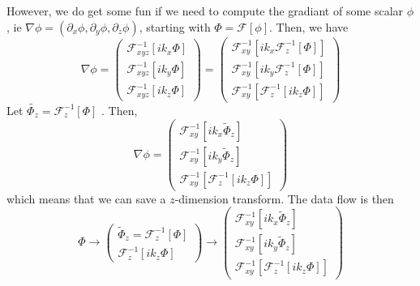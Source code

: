 \documentclass[12pt]{article}
\renewcommand{\(}{\left(}
\renewcommand{\)}{\right)}
\begin{document}
However, we do get some fun if we need to compute the gradiant of some
scalar $\phi$, ie
$\nabla\phi=\(\partial_x\phi,\partial_y\phi,\partial_z\phi\)$,
starting with $\Phi=\mathcal{F}\left[\phi\right]$.  Then, we have
\begin{dmath}
  \nabla\phi
  =
  \(
  \begin{matrix}
    \mathcal{F}^{-1}_{xyz}\left[ ik_x \Phi\right]\\
    \mathcal{F}^{-1}_{xyz}\left[ ik_y \Phi\right]\\
    \mathcal{F}^{-1}_{xyz}\left[ ik_z \Phi\right]
  \end{matrix}
  \)
  =
  \(
  \begin{matrix}
    \mathcal{F}^{-1}_{xy}\left[ik_x\mathcal{F}^{-1}_{z}\left[  \Phi\right]\right]\\
    \mathcal{F}^{-1}_{xy}\left[ik_y\mathcal{F}^{-1}_{z}\left[  \Phi\right]\right]\\
    \mathcal{F}^{-1}_{xy}\left[\mathcal{F}^{-1}_{z}\left[ ik_z \Phi\right]\right]
  \end{matrix}
  \)
\end{dmath}
Let $\tilde{\Phi_z}=\mathcal{F}^{-1}_{z}\left[\Phi\right]$ .  Then,
\begin{dmath}
  \nabla\phi
  =
  \(
  \begin{matrix}
    \mathcal{F}^{-1}_{xy}\left[ik_x \tilde\Phi_z \right]\\
    \mathcal{F}^{-1}_{xy}\left[ik_y \tilde\Phi_z \right]\\
    \mathcal{F}^{-1}_{xy}\left[\mathcal{F}^{-1}_{z}\left[ ik_z \Phi\right]\right]
  \end{matrix}
  \)
\end{dmath}
which means that we can save a $z$-dimension transform.  The data flow
is then
\begin{dmath}
  \Phi
  \rightarrow
  \left(
  \begin{matrix}
    \tilde\Phi_z=\mathcal{F}^{-1}_{z}\left[\Phi\right]\\
    \mathcal{F}^{-1}_{z}\left[ ik_z \Phi\right]
  \end{matrix}
  \right)
  \rightarrow
  \(
  \begin{matrix}
    \mathcal{F}^{-1}_{xy}\left[ik_x \tilde\Phi_z \right]\\
    \mathcal{F}^{-1}_{xy}\left[ik_y \tilde\Phi_z \right]\\
    \mathcal{F}^{-1}_{xy}\left[\mathcal{F}^{-1}_{z}\left[ ik_z \Phi\right]\right]
  \end{matrix}
  \)
\end{dmath}
\end{document}

